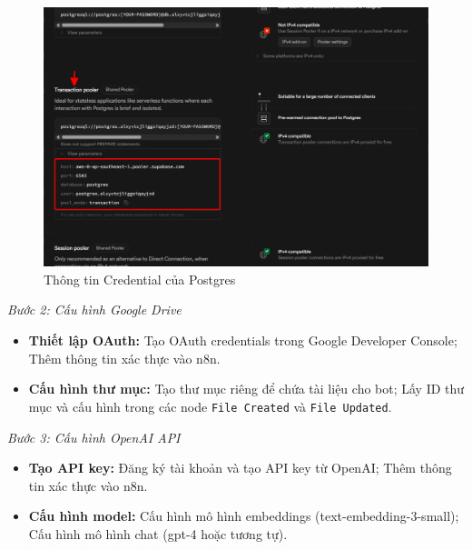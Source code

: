     
\begin{figure}[H]
\centering
\includegraphics[width=1\textwidth]{images/1rag07.pdf}
\caption{Thông tin Credential của Postgres}
\end{figure}
    
    

\textit{Bước 2: Cấu hình Google Drive}
\begin{itemize}
    \item \textbf{Thiết lập OAuth:} Tạo OAuth credentials trong Google Developer Console; Thêm thông tin xác thực vào n8n.
    
    \item \textbf{Cấu hình thư mục:} Tạo thư mục riêng để chứa tài liệu cho bot; Lấy ID thư mục và cấu hình trong các node \texttt{File Created} và \texttt{File Updated}.
\end{itemize}

\textit{Bước 3: Cấu hình OpenAI API}
\begin{itemize}
    \item \textbf{Tạo API key:} Đăng ký tài khoản và tạo API key từ OpenAI; Thêm thông tin xác thực vào n8n.
    
    \item \textbf{Cấu hình model:} Cấu hình mô hình embeddings (text-embedding-3-small); Cấu hình mô hình chat (gpt-4 hoặc tương tự).
\end{itemize}

